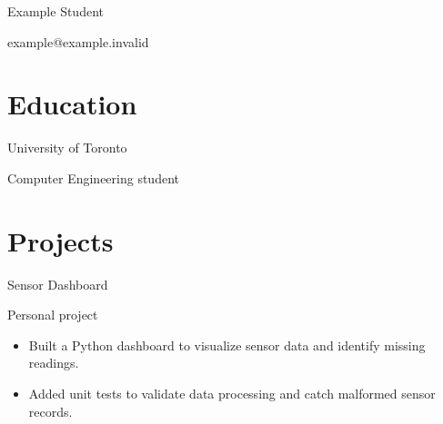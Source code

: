 \documentclass[12pt]{article}
\begin{document}
Example Student

example@example.invalid

\section*{Education}
University of Toronto

Computer Engineering student

\section*{Projects}
Sensor Dashboard

Personal project
\begin{itemize}
\item Built a Python dashboard to visualize sensor data and identify missing readings.
\item Added unit tests to validate data processing and catch malformed sensor records.
\end{itemize}
\end{document}
